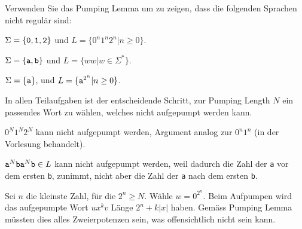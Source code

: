Verwenden Sie das Pumping Lemma um zu zeigen, dass die folgenden
Sprachen nicht regulär sind:
\begin{teilaufgaben}
\item $\Sigma=\{{\tt 0},{\tt 1},{\tt 2}\}$ und $L=\{ 0^n1^n2^n |n\ge 0\}$.
\item $\Sigma=\{{\tt a},{\tt b}\}$ und $L=\{ww|w\in \Sigma^*\}$.
\item $\Sigma=\{{\tt a}\}$, und $L=\{{\tt a}^{2^n}|n\ge 0\}$.
\end{teilaufgaben}

\begin{loesung}
In allen Teilaufgaben ist der entscheidende Schritt, zur Pumping Length
$N$ ein passendes Wort zu wählen, welches nicht aufgepumpt werden kann.
\begin{teilaufgaben}
\item $0^N1^N2^N$ kann nicht aufgepumpt werden, Argument analog zur
$0^n1^n$ (in der Vorlesung behandelt).
\item ${\tt a}^N{\tt ba}^N{\tt b}\in L$ kann nicht aufgepumpt werden,
weil dadurch die Zahl der {\tt a} vor dem ersten {\tt b}, zunimmt,
nicht aber die Zahl der {\tt a} nach dem ersten {\tt b}.
\item
Sei $n$ die kleinste Zahl, für die $2^n\ge N$. Wähle $w=0^{2^n}$.
Beim Aufpumpen wird das aufgepumpte Wort $ux^kv$ Länge $2^n+k|x|$
haben. Gemäss Pumping Lemma müssten dies alles Zweierpotenzen sein,
was offensichtlich nicht sein kann.
\qedhere
\end{teilaufgaben}
\end{loesung}


